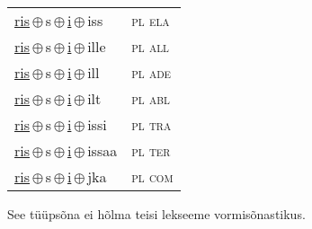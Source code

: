 \begin{minipage}{\textwidth}
\begin{sideways}
\begin{tabular}{l l}
\underline{ris}\,$\oplus$\,s\,$\oplus$\,\underline{i}\,$\oplus$\,iss & \textsc{ pl ela } \\
\underline{ris}\,$\oplus$\,s\,$\oplus$\,\underline{i}\,$\oplus$\,ille & \textsc{ pl all } \\
\underline{ris}\,$\oplus$\,s\,$\oplus$\,\underline{i}\,$\oplus$\,ill & \textsc{ pl ade } \\
\underline{ris}\,$\oplus$\,s\,$\oplus$\,\underline{i}\,$\oplus$\,ilt & \textsc{ pl abl } \\
\underline{ris}\,$\oplus$\,s\,$\oplus$\,\underline{i}\,$\oplus$\,issi & \textsc{ pl tra } \\
\underline{ris}\,$\oplus$\,s\,$\oplus$\,\underline{i}\,$\oplus$\,issaa & \textsc{ pl ter } \\
\underline{ris}\,$\oplus$\,s\,$\oplus$\,\underline{i}\,$\oplus$\,jka & \textsc{ pl com } \\
\end{tabular}
\end{sideways}
\label{tab:tüüpsõnamall-rissi}

\end{minipage}

 
\vspace{1em}
\noindent See tüüpsõna ei hõlma teisi lekseeme vormi\-sõnastikus.
